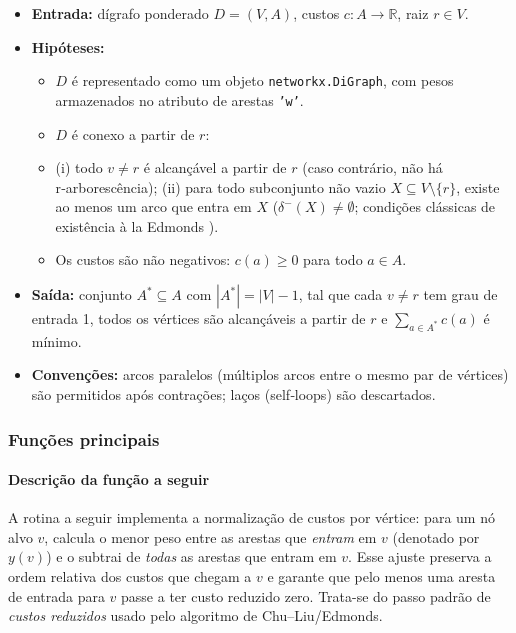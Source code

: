 \documentclass[12pt,a4paper]{article}
\begin{document}
\begin{itemize}\setlength{\itemsep}{2pt}
    \item \textbf{Entrada:} dígrafo ponderado \(D=(V,A)\), custos \(c:A\to\mathbb{R}\), raiz \(r\in V\).
    \item \textbf{Hipóteses:}
        \begin{itemize}\setlength{\itemsep}{2pt}
            \item \(D\) é representado como um objeto \texttt{networkx.DiGraph}, com pesos armazenados no atributo de arestas \texttt{'w'}.
            \item \(D\) é conexo a partir de \(r\):
            \item (i) todo \(v\neq r\) é alcançável a partir de \(r\) (caso contrário, não há r‑arborescência); (ii) para todo subconjunto não vazio \(X\subseteq V\setminus\{r\}\), existe ao menos um arco que entra em \(X\) (\(\delta^-(X)\neq\emptyset\); condições clássicas de existência \`a la Edmonds \cite{schrijver2003comb}).
            \item Os custos são não negativos: \(c(a)\ge 0\) para todo \(a\in A\).
        \end{itemize}
    \item \textbf{Saída:} conjunto \(A^*\subseteq A\) com \(|A^*|=|V|-1\), tal que cada \(v\neq r\) tem grau de entrada 1, todos os vértices são alcançáveis a partir de \(r\) e \(\sum_{a\in A^*} c(a)\) é mínimo.
    \item \textbf{Convenções:} arcos paralelos (múltiplos arcos entre o mesmo par de vértices) são permitidos após contrações; laços (self‑loops) são descartados.
\end{itemize}


\subsubsection{Funções principais}

\paragraph{Descrição da função a seguir}
A rotina a seguir implementa a normalização de custos por vértice: para um nó alvo $v$, calcula o menor peso entre as arestas que \emph{entram} em $v$ (denotado por $y(v)$) e o subtrai de \textit{todas} as arestas que entram em $v$. Esse ajuste preserva a ordem relativa dos custos que chegam a $v$ e garante que pelo menos uma aresta de entrada para $v$ passe a ter custo reduzido zero. Trata-se do passo padrão de \emph{custos reduzidos} usado pelo algoritmo de Chu–Liu/Edmonds.
\end{document}
